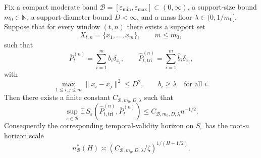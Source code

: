 \begin{theorem}
\label{thm:finite_discrete_embedded_sinkhorn}
Fix a compact moderate band $\mathcal B=[\varepsilon_{\min},\varepsilon_{\max}]
\subset (0,\infty)$, a support-size bound $m_0\in\mathbb N$, a support-diameter
bound $D<\infty$, and a mass floor $\lambda\in(0,1/m_0]$. Suppose that for every
window $(t,n)$ there exists a support set
\[
  X_{t,n}=\{x_1,\dots,x_m\},
  \qquad m\le m_0,
\]
such that
\[
  \bar P_t^{(n)}=\sum_{i=1}^m b_i\delta_{x_i},
  \qquad
  \widehat P_{t,\mathrm{tri}}^{(n)}=\sum_{i=1}^m \widehat b_i\delta_{x_i},
\]
with
\[
  \max_{1\le i,j\le m}\|x_i-x_j\|^2\le D^2,
  \qquad
  b_i\ge \lambda\quad\text{for all }i.
\]
Then there exists a finite constant $C_{\mathcal B,m_0,D,\lambda}$ such that
\[
  \sup_{\varepsilon\in\mathcal B}
  \mathbb E\,S_{\varepsilon}\!
  \left(\widehat P_{t,\mathrm{tri}}^{(n)},\bar P_t^{(n)}\right)
  \le C_{\mathcal B,m_0,D,\lambda} n^{-1/2}.
\]
Consequently the corresponding temporal-validity horizon on $S_{\varepsilon}$ has
the root-$n$ horizon scale
\[
  n^*_{\mathcal B}(H)
  \asymp
  \left(C_{\mathcal B,m_0,D,\lambda}/\zeta\right)^{1/(H+1/2)}.
\]
\end{theorem}

